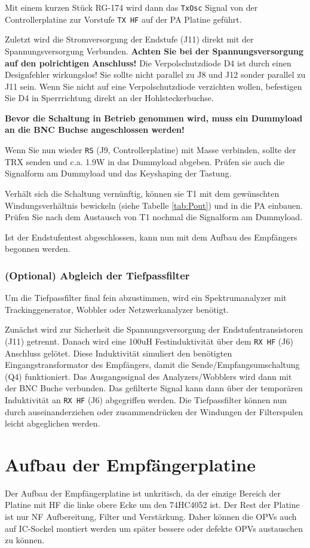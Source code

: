 \documentclass[10pt, a4paper]{paper}
\newcommand{\warn}[1]{\textbf{#1}}
\newcommand{\con}[1]{\texttt{#1}}
\begin{document}
Mit einem kurzen Stück RG-174 wird dann das \con{TxOsc} Signal von der Controllerplatine zur Vorstufe \con{TX HF} auf der PA Platine geführt.

Zuletzt wird die Stromversorgung der Endstufe (J11) direkt mit der Spannungsversorgung Verbunden.  \warn{Achten Sie bei der Spannungsversorgung auf den polrichtigen Anschluss!} Die Verpolschutzdiode D4 ist durch einen Designfehler wirkungslos! Sie sollte nicht parallel zu J8 und J12 sonder parallel zu J11 sein. Wenn Sie nicht auf eine Verpolschutzdiode verzichten wollen, befestigen Sie D4 in Sperrrichtung direkt an der Hohlsteckerbuchse.

\warn{Bevor die Schaltung in Betrieb genommen wird, muss ein Dummyload an die BNC Buchse angeschlossen werden!}

Wenn Sie nun wieder \con{RS} (J9, Controllerplatine) mit Masse verbinden, sollte der TRX senden und c.a. 1.9W in das Dummyload abgeben.  Prüfen sie auch die Signalform am Dummyload und das Keyshaping der Tastung.

Verhält sich die Schaltung vernünftig, können sie T1 mit dem gewünschten Windungsverhältnis bewickeln (siehe Tabelle \ref{tab:Pout}) und in die PA einbauen. Prüfen Sie nach dem Austausch von T1 nochmal die Signalform am Dummyload. 

Ist der Endstufentest abgeschlossen, kann nun mit dem Aufbau des Empfängers begonnen werden. 
 
\subsubsection{(Optional) Abgleich der Tiefpassfilter}
Um die Tiefpassfilter final fein abzustimmen, wird ein Spektrumanalyzer mit Trackinggenerator, Wobbler oder Netzwerkanalyzer benötigt. 

Zunächst wird zur Sicherheit die Spannungsversorgung der Endstufentransistoren (J11) getrennt. Danach wird eine 100uH Festinduktivität über dem \con{RX HF} (J6) Anschluss gelötet. Diese Induktivität simuliert den benötigten Eingangstransformator des Empfängers, damit die Sen\-de/Emp\-fangs\-um\-schal\-tung (Q4) funktioniert. Das Ausgangssignal des Analyzers/Wobblers wird dann mit der BNC Buche verbunden. Das gefilterte Signal kann dann über der temporären Induktivität an \con{RX HF} (J6) abgegriffen werden. Die Tiefpassfilter können nun durch auseinanderziehen oder zusammendrücken der Windungen der Filterspulen leicht abgeglichen werden. 


\clearpage
\section{Aufbau der Empfängerplatine} \label{sec:rx}
Der Aufbau der Empfängerplatine ist unkritisch, da der einzige Bereich der Platine mit HF die linke obere Ecke um den 74HC4052 ist. Der Rest der Platine ist nur NF Aufbereitung, Filter und Verstärkung. Daher können die OPVs auch auf IC-Sockel montiert werden um später bessere oder defekte OPVs austauschen zu können. 
\end{document}
